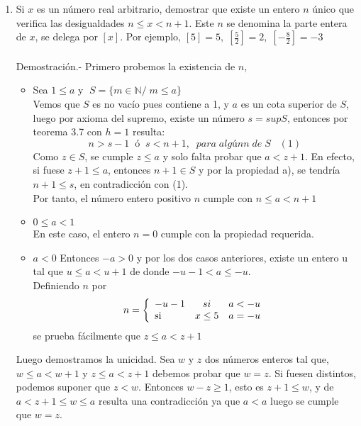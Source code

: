 \begin{enumerate}
\item Si $x$ es un número real arbitrario, demostrar que existe un entero $n$ único que verifica las desigualdades $n\leq x < n+1$. Este $n$ se denomina la parte entera de $x$, se delega por $[x]$. Por ejemplo, $[5]=5,\; \left[ \frac{5}{2}\right] =2, \; \left[ -\frac{8}{2} \right]=-3$\\\\
Demostración.-\; Primero probemos la existencia de $n$,
\begin{itemize}
\item  Sea $1\leq a $  \; y  \; $\; S=\lbrace m \in \mathbb{N}/\; m \leq a \rbrace$\\ 
Vemos que $S$ es no vacío pues contiene a 1, y \; $a$ \; es un cota superior de $S$, luego por axioma del supremo, existe un número $s=supS$, entonces por teorema 3.7 \; con $h=1$ resulta:
$$n>s-1 \; \; ó \; \; s<n+1, \; \; para \; algún n \; de \; S \; \; \; (1) $$
Como $z \in S$, se cumple $z\leq a$ y solo falta probar que $a<z+1$. En efecto, si fuese $z+1\leq a$, entonces $n+1 \in S$ y por la propiedad a), se tendría $n+1\leq s$, en contradicción con (1).   \\
Por tanto, el número entero positivo $n$ cumple con $n\leq a < n+1$
\item $0\leq a < 1$\\
En este caso, el entero $n=0$ cumple con la propiedad requerida.
\item $a<0$
Entonces $-a>0$ \; y por los dos casos anteriores, existe un entero u tal que $u\leq a< u+1$ de donde $-u-1<a\leq -u$.\\
Definiendo $n$ por  
\begin{equation}
n = \left\lbrace
\begin{array}{lcr}
-u-1 & si & a<-u\\
\textup{si } & x\leq 5 & a=-u
\end{array}        
\right.
\end{equation}
se prueba fácilmente que $z\leq a < z+1$
\end{itemize}
Luego demostramos la unicidad. Sea $w$ y $z$ dos números enteros tal que, $w\leq a < w + 1$ y $z \leq a < z + 1$ debemos probar que $w=z$. Si fuesen distintos, podemos suponer que $z<w$. Entonces $w-z\geq 1$, esto es $z+1\leq w$, y de $a<z+1\leq w \leq a$ resulta una contradicción ya que $a<a$ luego se cumple que $w=z$. \\\\ 


\end{enumerate}

